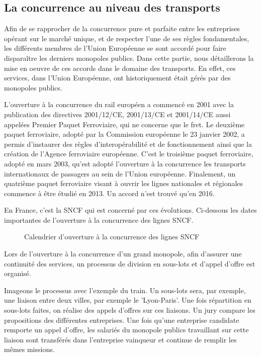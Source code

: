   \subsection{La concurrence au niveau des transports}

Afin de se rapprocher de la concurrence pure et parfaite entre les entreprises opérant sur le marché unique, et de respecter l'une de ses règles fondamentales, les différents membres de l'Union Européenne se sont accordé pour faire disparaître les derniers monopoles publics.
Dans cette partie, nous détaillerons la mise en oeuvre de ces accords dans le domaine des transports. En effet, ces services, dans l'Union Européenne, ont historiquement était gérés par des monopoles publics.

L'ouverture à la concurrence du rail européen a commencé en 2001 avec la publication des directives 2001/12/CE, 2001/13/CE et 2001/14/CE aussi appelées Premier Paquet Ferroviaire, qui ne concerne que le fret. 
Le deuxième paquet ferroviaire, adopté par la Commission européenne le 23 janvier 2002, a permis d'instaurer des règles d'interopérabilité et de fonctionnement ainsi que la création de l'Agence ferroviaire européenne.
C'est le troisième paquet ferroviaire, adopté en mars 2003, qu'est adopté l'ouverture à la concurrence les transports internationaux de passagers au sein de l'Union européenne.
Finalement, un quatrième paquet ferroviaire visant à ouvrir les lignes nationales et régionales commence à être étudié en 2013. Un accord n'est trouvé qu'en 2016. 

En France, c'est la SNCF qui est concerné par ces évolutions. Ci-dessous les dates importantes de l'ouverture à la concurrence des lignes SNCF.

\begin{figure}[htbp]
    \centering
    
    \caption{Calendrier d'ouverture à la concurrence des lignes SNCF}\label{fig:calsncf}
\end{figure}

Lors de l'ouverture à la concurrence d'un grand monopole, afin d'assurer une continuité des services, un processus de division en sous-lots et d'appel d'offre est organisé.

Imageons le processus avec l'exemple du train. Un sous-lots sera, par exemple, une liaison entre deux villes, par exemple le 'Lyon-Paris'. Une fois répartition en sous-lots faites, on réalise des appels d'offres sur ces liaisons. Un jury compare les propositions des différentes entreprises. Une fois qu'une entreprise candidate remporte un appel d'offre, les salariés du monopole publics travaillant sur cette liaison sont transférés dans l'entreprise vainqueur et continue de remplir les mêmes missions.

